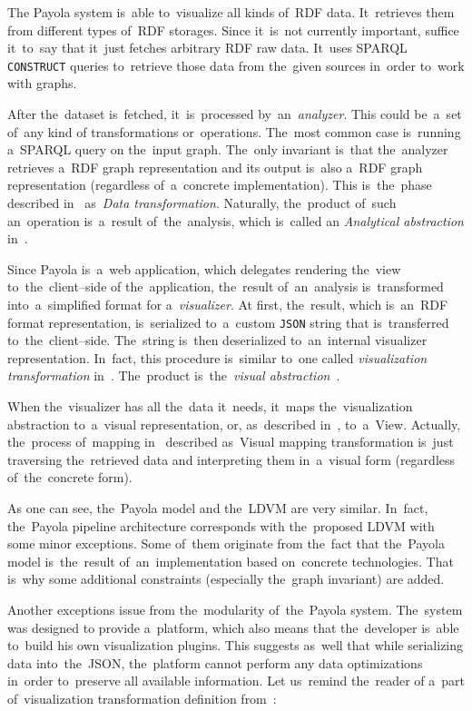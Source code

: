 The Payola system is~able to~visualize all kinds of~RDF data. It~retrieves them from different
types of~RDF storages. Since it~is~not currently important, suffice it~to~say that it~just fetches
arbitrary RDF raw data. It~uses SPARQL \texttt{CONSTRUCT} queries to~retrieve those data from
the~given sources in~order to~work with graphs.

After the~dataset is~fetched, it~is~processed by~an~\emph{analyzer}. This could be~a~set of~any kind
of transformations or~operations. The~most common case is~running a~SPARQL query
on the~input graph. The~only invariant is~that the~analyzer retrieves a~RDF graph
representation and its output is~also a~RDF graph representation (regardless of~a~concrete
implementation). This is~the~phase described in~\cite{ldvm} as~\emph{Data transformation}.
Naturally, the~product of~such an~operation is~a~result of~the~analysis, which is~called an
\emph{Analytical abstraction} in~\cite{ldvm}.

Since Payola is~a~web application, which delegates rendering the~view to~the~client--side
of the~application, the~result of~an~analysis is~transformed into~a~simplified format for a~\emph{visualizer}.
At first, the~result, which is~an~RDF format representation, is~serialized to~a~custom \texttt{JSON} string
that is~transferred to~the~client--side. The~string is~then deserialized to~an~internal visualizer
representation. In~fact, this procedure is~similar to~one called \emph{visualization transformation}
in~\cite{ldvm}. The~product is~the~\emph{visual abstraction}~\cite{ldvm}.

When the~visualizer has all the~data it~needs, it~maps the~visualization abstraction to~a~visual
representation, or, as~described in~\cite{ldvm}, to~a~View. Actually, the~process of~mapping in~\cite{ldvm}
described as~Visual mapping transformation is~just traversing the~retrieved data and interpreting
them in~a~visual form (regardless of~the~concrete form).

As one can see, the~Payola model and the~LDVM are very similar. In~fact, the~Payola pipeline
architecture corresponds with the~proposed LDVM with some minor exceptions. Some of~them
originate from the~fact that the~Payola model is~the~result of~an~implementation
based on~concrete technologies. That is~why some additional constraints (especially
the~graph invariant) are added.

Another exceptions issue from the~modularity of~the~Payola system. The~system was designed
to provide a~platform, which also means that the~developer is~able to~build his own visualization 
plugins. This suggests as~well that while serializing data into~the~JSON, the~platform cannot perform
any data optimizations in~order to~preserve all available information. Let us~remind the~reader of
a~part of~visualization transformation definition from~\cite{ldvm}:

